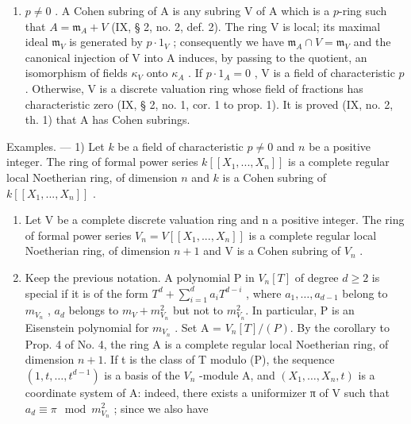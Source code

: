 \begin{enumerate}
\def\labelenumi{\Alph{enumi})}
\setcounter{enumi}{1}
\tightlist
\item
  \(p \neq 0\) . A Cohen subring of A is any subring V of A which is a \(p\)-ring such that \(A = \mathfrak{m}_{A} + V\) (IX, § 2, no. 2, def. 2). The ring V is local; its maximal ideal \(\mathfrak{m}_{V}\) is generated by \(p \cdot 1_{V}\) ; consequently we have \(\mathfrak{m}_{A} \cap V = \mathfrak{m}_{V}\) and the canonical injection of V into A induces, by passing to the quotient, an isomorphism of fields \(\kappa_{V}\) onto \(\kappa_{A}\) . If \(p \cdot 1_{A} = 0\) , V is a field of characteristic \(p\) . Otherwise, V is a discrete valuation ring whose field of fractions has characteristic zero (IX, § 2, no. 1, cor. 1 to prop. 1). It is proved (IX, no. 2, th. 1) that A has Cohen subrings.
\end{enumerate}

Examples. --- 1) Let \(k\) be a field of characteristic \(p \neq 0\) and \(n\) be a positive integer. The ring of formal power series \(k[[X_1, ..., X_n]]\) is a complete regular local Noetherian ring, of dimension \(n\) and \(k\) is a Cohen subring of \(k[[X_1, ..., X_n]]\) .

\begin{enumerate}
\def\labelenumi{\arabic{enumi})}
\setcounter{enumi}{1}
\item
  Let V be a complete discrete valuation ring and n a positive integer. The ring of formal power series \(V_{n} = V[[X_{1}, ..., X_{n}]]\) is a complete regular local Noetherian ring, of dimension \(n + 1\) and V is a Cohen subring of \(V_{n}\) .
\item
  Keep the previous notation. A polynomial P in \(V_{n}[T]\) of degree \(d \geqslant 2\) is special if it is of the form \(T^{d} + \sum_{i=1}^{d} a_{i} T^{d-i}\) , where \(a_{1}, \ldots, a_{d-1}\) belong to \(m_{V_{n}}\) , \(a_{d}\) belongs to \(m_{V} + m_{V_{n}}^{2}\) but not to \(m_{V_{n}}^{2}\). In particular, P is an Eisenstein polynomial for \(m_{V_{n}}\) . Set A = \(V_{n}[T]/(P)\). By the corollary to Prop. 4 of No. 4, the ring A is a complete regular local Noetherian ring, of dimension \(n + 1\). If t is the class of T modulo (P), the sequence \((1, t, \ldots, t^{d-1})\) is a basis of the \(V_{n}\) -module A, and \((X_{1}, \ldots, X_{n}, t)\) is a coordinate system of A: indeed, there exists a uniformizer π of V such that \(a_{d} \equiv \pi \mod m_{V_{n}}^{2}\) ; since we also have
\end{enumerate}

